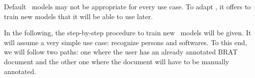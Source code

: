\documentclass[manual-fr.tex]{subfiles}
\begin{document}
Default \SEM\ models may not be appropriate for every use case. To adapt \SEM, it offers to train new models that it will be able to use later.

In the following, the step-by-step procedure to train new \SEM\ models will be given. It will assume a very simple use case: recognize persons and softwares. To this end, we will follow two paths: one where the user has an already annotated BRAT document and the other one where the document will have to be manually annotated.
\end{document}
